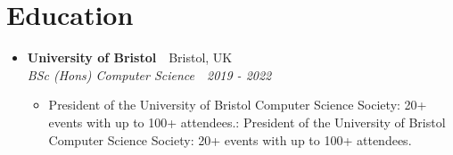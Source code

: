 \documentclass[a4paper,11pt]{article}
\def\ifempty#1{\def\temp{#1}\ifx\temp\empty}
\newcommand{\resumeItem}[2]{
  \item\small{
    \ifempty{#1}#2\else\textbf{#1}{: #2\vspace{-2pt}}\fi
  }
}
\newcommand{\resumeSubheading}[4]{
  \vspace{-1pt}\item[]
    \textbf{#1}~\hfill~#2 \\
    \textit{\small#3}~\hfill~\textit{\small#4}
  \vspace{-5pt}
}
\newcommand{\resumeSubHeadingListStart}{\begin{itemize}[leftmargin=0pt, label={}, itemindent=0pt]}
\newcommand{\resumeSubHeadingListEnd}{\end{itemize}}
\newcommand{\resumeItemListStart}{\begin{itemize}[leftmargin=0.15in]}
\newcommand{\resumeItemListEnd}{\end{itemize}\vspace{-5pt}}
\begin{document}
\section{Education}
  \resumeSubHeadingListStart
    \resumeSubheading
      {University of Bristol}{Bristol, UK}
      {BSc (Hons) Computer Science}{2019 - 2022}
      \resumeItemListStart
      	\resumeItem{}
          {President of the University of Bristol Computer Science Society: 20+ events with up to 100+ attendees.}
      \resumeItemListEnd
  \resumeSubHeadingListEnd

  
\end{document}
